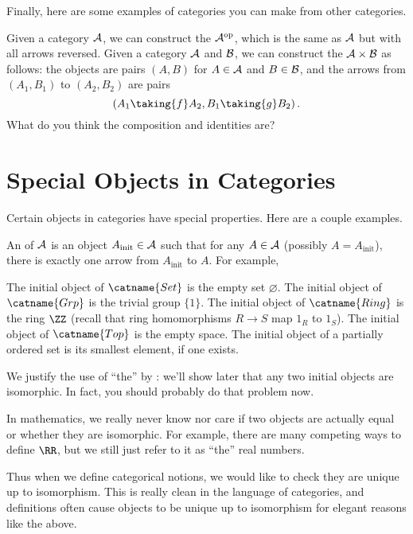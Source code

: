 \documentclass[11pt]{scrreprt}
\begin{document}
Finally, here are some examples of categories you can make from other categories.
\begin{example}
	\listhack
	\begin{enumerate}[(a)]
		\ii Given a category $\AA$, we can construct the 
		$\AA^{\text{op}}$, which is the same as $\AA$ but with all arrows reversed.
		\ii Given a category $\AA$ and $\BB$, we can construct the  $\AA \times \BB$
		as follows: the objects are pairs $(A, B)$ for $A \in \AA$ and $B \in \BB$,
		and the arrows from $(A_1, B_1)$ to $(A_2, B_2)$
		are pairs \[ \left( A_1 \taking{f} A_2, B_1 \taking{g} B_2 \right). \]
		What do you think the composition and identities are?
	\end{enumerate}
\end{example}

\section{Special Objects in Categories}
Certain objects in categories have special properties.
Here are a couple examples.
\begin{example}
	An  of $\AA$ is an object
	$A_{\text{init}} \in \AA$ such that for any $A \in \AA$ (possibly $A = A_{\text{init}}$),
	there is exactly one arrow from $A_{\text{init}}$ to $A$.
	For example,
	\begin{enumerate}[(a)]
		\ii The initial object of $\catname{Set}$ is the empty set $\varnothing$.
		\ii The initial object of $\catname{Grp}$ is the trivial group $\{1\}$.
		\ii The initial object of $\catname{Ring}$ is the ring $\ZZ$
		(recall that ring homomorphisms $R \to S$ map $1_R$ to $1_S$).
		\ii The initial object of $\catname{Top}$ is the empty space.
		\ii The initial object of a partially ordered set is its smallest element, if one exists.
	\end{enumerate}
\end{example}

We justify the use of ``the'' by :
we'll show later that any two initial objects are isomorphic.
In fact, you should probably do that problem now.
\begin{remark}
	In mathematics, we really never know nor care if two objects are actually equal
	or whether they are isomorphic.
	For example, there are many competing ways to define $\RR$,
	but we still just refer to it as ``the'' real numbers.

	Thus when we define categorical notions, we would like to check they are
	unique up to isomorphism.
	This is really clean in the language of categories, and definitions
	often cause objects to be unique up to isomorphism for elegant reasons like the above.
\end{remark}
\end{document}
